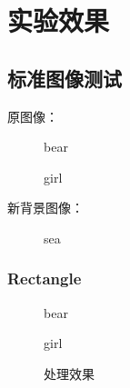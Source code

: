 \documentclass[14pt]{scrartcl} %
\begin{document}
	\pagebreak
	
	\section{实验效果}
	
	\subsection{标准图像测试}
	
	原图像：
	
	\begin{figure}[h] %
		\begin{minipage}[t]{0.5\linewidth}
			\centering
			\caption{bear}
		\end{minipage}%
		\begin{minipage}[t]{0.5\linewidth}
			\centering
			\caption{girl}
		\end{minipage}
	\end{figure}
	
	新背景图像：
	
	\begin{figure}[h] %
		\centering
		\caption{sea}
	\end{figure}
	
	\pagebreak
	\subsubsection{Rectangle}
	
	\begin{figure}[h] %
		\begin{minipage}[t]{0.5\linewidth}
			\centering
			\caption{bear}
		\end{minipage}%
		\begin{minipage}[t]{0.5\linewidth}
			\centering
			\caption{girl}
		\end{minipage}
	\end{figure}
	
	\begin{figure}[h] %
		\centering
		\caption{处理效果}
	\end{figure}
	
\end{document}
